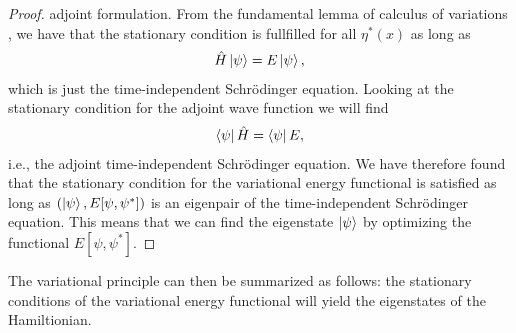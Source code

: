 \begin{proof}
            adjoint formulation.
            From the fundamental lemma of calculus of variations
            \cite{jost1998calculus}, we have that the stationary condition
            is fullfilled for all $\eta^{*}(x)$ as long as
            \begin{align}
                \hat{H}\ket{\psi}
                = E\ket{\psi},
            \end{align}
            which is just the time-independent Schrödinger equation.
            Looking at the stationary condition for the adjoint wave function we
            will find
            \begin{align}
                \bra{\psi}\hat{H} = \bra{\psi}E,
            \end{align}
            i.e., the adjoint time-independent Schrödinger equation.
            We have therefore found that the stationary condition for the
            variational energy functional is satisfied as long as $(\ket{\psi},
            E[\psi, \psi^{*}])$ is an eigenpair of the time-independent
            Schrödinger equation.
            This means that we can find the eigenstate $\ket{\psi}$ by
            optimizing the functional $E[\psi, \psi^{*}]$.
        \end{proof}
        The variational principle can then be summarized as follows: the
        stationary conditions of the variational energy functional will yield
        the eigenstates of the Hamiltionian.


